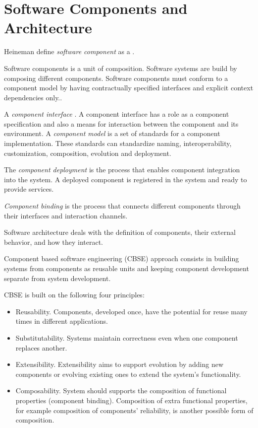 \section{Software Components and Architecture}

Heineman define \emph{software component} as a
\cite{heineman_component-based_2001}.

Software components is a unit of composition. Software systems are build by composing different components.  Software components must conform to a component model by having contractually specified interfaces and explicit context dependencies only.\cite{szyperski_component_2002}.

A \emph{component	interface} \cite{crnkovic_software_2011}.
A component interface has a role as a component specification and also a means for interaction between the component and its environment.
A \emph{component model} is a set of standards for a component implementation. These standards can standardize naming, interoperability, customization, composition, evolution and deployment.\cite{heineman_component-based_2001}

The \emph{component deployment} is the process that enables component integration into the system. A deployed component is registered in the system and ready to provide services\cite{crnkovic_software_2011}.

\emph{Component binding} is the process that connects different components through their interfaces and interaction channels.

Software architecture deals with the definition of components, their external behavior, and how they interact.\cite{kaur_component_2010}

Component based software engineering (CBSE) approach consists in building systems from components as reusable units and keeping component development separate from system development\cite{crnkovic_software_2011}.

CBSE is built on the following four principles\cite{crnkovic_software_2011}:
\begin{itemize}
  \item Reusability. Components, developed once, have the potential for reuse many times in different applications.
  \item Substitutability. Systems maintain correctness even when one component replaces another.
  \item Extensibility. Extensibility aims to support evolution by adding new components or evolving existing ones to extend the system’s functionality.
  \item Composability. System should supports the composition of functional properties (component binding). Composition of extra functional properties, for example composition of components’ reliability, is another possible form of composition.
\end{itemize}
